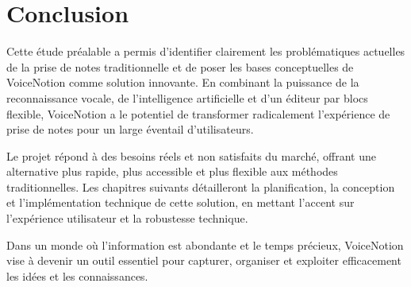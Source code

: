 
\section{Conclusion}

Cette étude préalable a permis d'identifier clairement les problématiques actuelles de la prise de notes traditionnelle et de poser les bases conceptuelles de VoiceNotion comme solution innovante. En combinant la puissance de la reconnaissance vocale, de l'intelligence artificielle et d'un éditeur par blocs flexible, VoiceNotion a le potentiel de transformer radicalement l'expérience de prise de notes pour un large éventail d'utilisateurs.

Le projet répond à des besoins réels et non satisfaits du marché, offrant une alternative plus rapide, plus accessible et plus flexible aux méthodes traditionnelles. Les chapitres suivants détailleront la planification, la conception et l'implémentation technique de cette solution, en mettant l'accent sur l'expérience utilisateur et la robustesse technique.

Dans un monde où l'information est abondante et le temps précieux, VoiceNotion vise à devenir un outil essentiel pour capturer, organiser et exploiter efficacement les idées et les connaissances. 